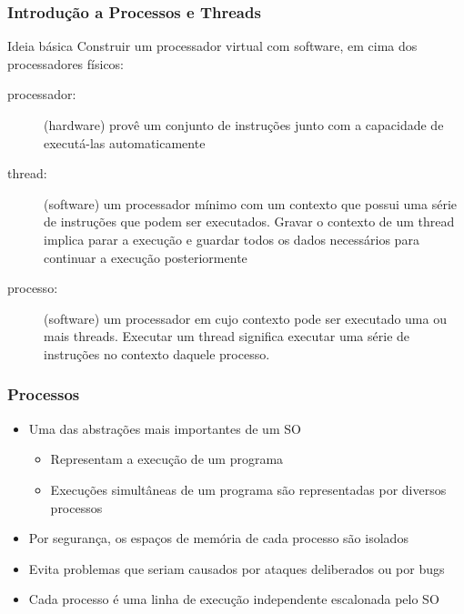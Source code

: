 \documentclass[Ligatures=TeX,table,brazil,svgnames,usetotalslideindicator,compress,10pt]{beamer}
\begin{document}
\begin{frame}
  \frametitle{Introdução a Processos e Threads}

  \begin{block}{Ideia básica}
    Construir um \alert{processador virtual} com software, em cima dos processadores físicos:
  \end{block}

  \begin{description}
  \item[processador:] (hardware) provê um conjunto de instruções junto
    com a capacidade de executá-las automaticamente
  \item[thread:] (software) um processador mínimo com um
    \alert{contexto} que possui uma série de instruções que podem ser
    executados. Gravar o contexto de um thread implica parar
    a execução e guardar todos os dados necessários para continuar a
    execução posteriormente
  \item[processo:] (software) um processador em cujo contexto pode ser
    executado uma ou mais threads. Executar um thread significa
    executar uma série de instruções no contexto daquele
    processo.
  \end{description}

\end{frame}

\begin{frame}
  \frametitle{Processos}
  \begin{itemize}
  \item Uma das abstrações mais importantes de um SO
    \begin{itemize}
    \item Representam \alert{a execução} de um programa
      \item Execuções simultâneas de um programa são representadas por diversos processos
    \end{itemize}
  \item Por segurança, os \alert{espaços de memória} de cada processo são \alert{isolados}
  \item  Evita problemas que seriam causados por ataques deliberados ou por bugs
  \item Cada processo é uma \alert{linha de execução independente} escalonada pelo SO
  \end{itemize}

\end{frame}
\end{document}
